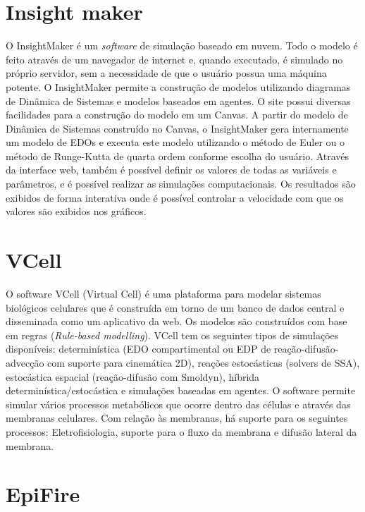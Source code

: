 \documentclass[
	12pt,				%
	openright,			%
	oneside,			%
	a4paper,			%
	main=brazil,
	english,			%
	]{ufsj-abntex2}
\begin{document}
\section{Insight maker}
    
O InsightMaker \cite{insightmaker} é um \textit{software} de simulação baseado em nuvem. Todo o modelo é feito através de um navegador de internet e, quando executado, é simulado no próprio servidor, sem a necessidade de que o usuário possua uma máquina potente. O InsightMaker \cite{insightmaker} permite a construção de modelos utilizando diagramas de Dinâmica de Sistemas e modelos baseados em agentes. O site possui diversas facilidades para a construção do modelo em um Canvas. A partir do modelo de Dinâmica de Sistemas construído no Canvas, o InsightMaker \cite{insightmaker} gera internamente um modelo de EDOs e executa este modelo utilizando o método de Euler ou o método de Runge-Kutta de quarta ordem conforme escolha do usuário. Através da interface web, também é possível definir os valores de todas as variáveis e parâmetros, e é possível realizar as simulações computacionais. Os resultados são exibidos de forma interativa onde é possível controlar a velocidade com que os valores são exibidos nos gráficos. 

\section{VCell}

O software VCell (Virtual Cell) \cite{vcell,VCellref1} é uma plataforma para modelar sistemas biológicos celulares que é construída em torno de um banco de dados central e disseminada como um aplicativo da web. Os modelos são construídos com base em regras (\textit{Rule-based modelling}). VCell tem os seguintes tipos de simulações disponíveis: determinística (EDO compartimental ou EDP de reação-difusão-advecção com suporte para cinemática 2D), reações estocásticas (solvers de SSA), estocástica espacial (reação-difusão com Smoldyn), híbrida determinística/estocástica e simulações baseadas em agentes. O software permite simular vários processos metabólicos que ocorre dentro das células e através das membranas celulares. Com relação às membranas, há suporte para os seguintes processos: Eletrofisiologia, suporte para o fluxo da membrana e difusão lateral da membrana. 

\section{EpiFire}
\end{document}
